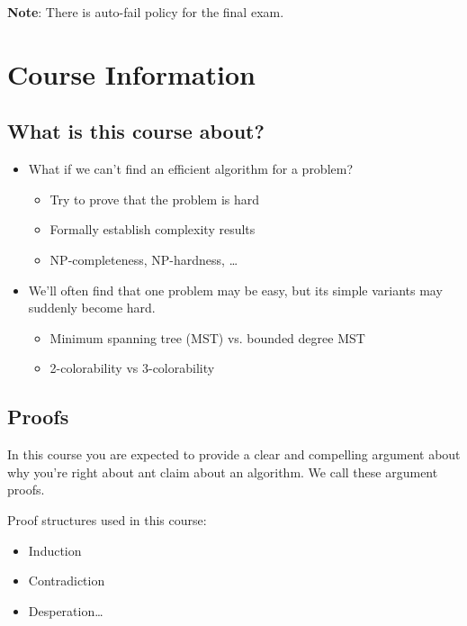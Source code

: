 \textbf{Note}: There is  auto-fail policy for the final exam.

\section{Course Information}

\subsection{What is this course about?}

\begin{itemize}
    \item What if we can't find an efficient algorithm for a problem?

    \begin{itemize}
        \item Try to prove that the problem is hard 
        \item Formally establish complexity results 
        \item NP-completeness, NP-hardness, \dots
    \end{itemize}
    
    \item We'll often find that one problem may be easy, but its simple variants may suddenly become hard. 
    
    \begin{itemize}
        \item Minimum spanning tree (MST) vs. bounded degree MST
        \item 2-colorability vs 3-colorability
    \end{itemize}
\end{itemize}

\subsection{Proofs}

In this course you are expected to provide a clear and compelling argument about why you're right about ant claim about an algorithm. We call these argument proofs. 

Proof structures used in this course:
\begin{itemize}
    \item Induction 
    \item Contradiction
    \item Desperation\dots
\end{itemize}

